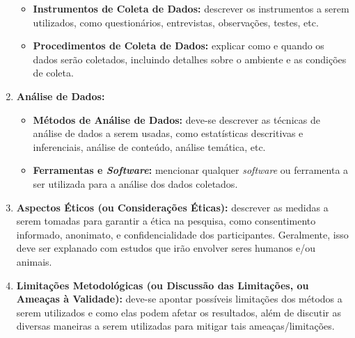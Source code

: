 \begin{enumerate}[label=\roman*., itemsep=0pt, leftmargin=2.3cm]
\begin{itemize}[itemsep=0pt]
            \item \textbf{Instrumentos de Coleta de Dados:} descrever os instrumentos a serem utilizados, como questionários, entrevistas, observações, testes, etc.
            \item \textbf{Procedimentos de Coleta de Dados:} explicar como e quando os dados serão coletados, incluindo detalhes sobre o ambiente e as condições de coleta.
        \end{itemize}
    \item \textbf{Análise de Dados:}
        \begin{itemize}[itemsep=0pt]
            \item \textbf{Métodos de Análise de Dados:} deve-se descrever as técnicas de análise de dados a serem usadas, como estatísticas descritivas e inferenciais, análise de conteúdo, análise temática, etc.
            \item \textbf{Ferramentas e \textit{Software}:} mencionar qualquer \textit{software} ou ferramenta a ser utilizada para a análise dos dados coletados.
        \end{itemize}
    \item \textbf{Aspectos Éticos (ou Considerações Éticas):} descrever as medidas a serem tomadas para garantir a ética na pesquisa, como consentimento informado, anonimato, e confidencialidade dos participantes. Geralmente, isso deve ser explanado com estudos que irão envolver seres humanos e/ou animais.
    \item \textbf{Limitações Metodológicas (ou Discussão das Limitações, ou Ameaças à Validade):} deve-se apontar possíveis limitações dos métodos a serem utilizados e como elas podem afetar os resultados, além de discutir as diversas maneiras a serem utilizadas para mitigar tais ameaças/limitações.
\end{enumerate}
